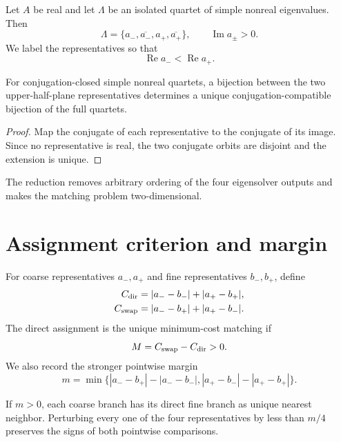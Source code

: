 \documentclass[12pt]{article}
\theoremstyle{remark}\newtheorem{remark}[theorem]{Remark}
\begin{document}
Let $A$ be real and let $\Lambda$ be an isolated quartet of simple nonreal
eigenvalues.  Then
\begin{equation}\label{eq:quartet}
 \Lambda=\{a_-,\overline{a_-},a_+,\overline{a_+}\},
 \qquad \operatorname{Im}a_\pm>0.
\end{equation}
We label the representatives so that
\begin{equation}\label{eq:order}
 \operatorname{Re}a_-<\operatorname{Re}a_+.
\end{equation}

\begin{proposition}\label{prop:reduction}
For conjugation-closed simple nonreal quartets, a bijection between the two
upper-half-plane representatives determines a unique conjugation-compatible
bijection of the full quartets.
\end{proposition}

\begin{proof}
Map the conjugate of each representative to the conjugate of its image.
Since no representative is real, the two conjugate orbits are disjoint and
the extension is unique.
\end{proof}

The reduction removes arbitrary ordering of the four eigensolver outputs and
makes the matching problem two-dimensional.

\section{Assignment criterion and margin}

For coarse representatives $a_-,a_+$ and fine representatives $b_-,b_+$,
define
\begin{align}\label{eq:costs}
 C_{\rm dir}&=|a_--b_-|+|a_+-b_+|,\\
 C_{\rm swap}&=|a_--b_+|+|a_+-b_-|.
\end{align}
The direct assignment is the unique minimum-cost matching if
\begin{equation}\label{eq:margin}
 M=C_{\rm swap}-C_{\rm dir}>0.
\end{equation}
We also record the stronger pointwise margin
\begin{equation}\label{eq:pointwise}
 m=\min\bigl\{|a_--b_+|-|a_--b_-|,
 |a_+-b_-|-|a_+-b_+|\bigr\}.
\end{equation}

\begin{proposition}\label{prop:robust}
If $m>0$, each coarse branch has its direct fine branch as unique nearest
neighbor.  Perturbing every one of the four representatives by less than
$m/4$ preserves the signs of both pointwise comparisons.
\end{proposition}
\end{document}
